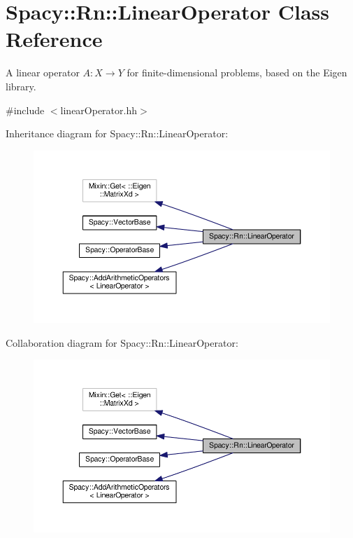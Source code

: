 \hypertarget{classSpacy_1_1Rn_1_1LinearOperator}{\section{Spacy\-:\-:Rn\-:\-:Linear\-Operator Class Reference}
\label{classSpacy_1_1Rn_1_1LinearOperator}
}


A linear operator $A:X\rightarrow Y$ for finite-\/dimensional problems, based on the Eigen library.  




{\ttfamily \#include $<$linear\-Operator.\-hh$>$}



Inheritance diagram for Spacy\-:\-:Rn\-:\-:Linear\-Operator\-:
\nopagebreak
\begin{figure}[H]
\begin{center}
\leavevmode
\includegraphics[width=350pt]{classSpacy_1_1Rn_1_1LinearOperator__inherit__graph}
\end{center}
\end{figure}


Collaboration diagram for Spacy\-:\-:Rn\-:\-:Linear\-Operator\-:
\nopagebreak
\begin{figure}[H]
\begin{center}
\leavevmode
\includegraphics[width=350pt]{classSpacy_1_1Rn_1_1LinearOperator__coll__graph}
\end{center}
\end{figure}
